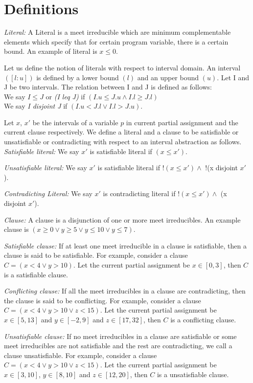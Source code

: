 \section{Definitions}
%
\textit{Literal:} A Literal is a meet irreducible which are minimum complementable
elements which specify that for certain program variable, there is a certain
bound. An example of literal is $x \leq 0$.

Let us define the notion of literals with respect to interval domain. 
An interval $([l:u])$ is defined by a lower bound $(l)$ and an upper bound $(u)$.
Let I and J be two intervals. The relation between I and J is defined as follows:\\
We say $I \leq J$ or {\em (I leq J)} if $(I.u \leq J.u \wedge I.l \geq J.l)$\\
We say {\em I disjoint J} if $(I.u < J.l \vee  I.l > J.u)$.

Let $x$, $x'$ be the intervals of a variable $p$ in current 
partial assignment and the current clause respectively. 
We define a literal and a clause to be satisfiable or unsatisfiable 
or contradicting with respect to an interval abstraction as follows. \\
\textit{Satisfiable literal:} 
We say $x'$ is satisfiable literal if $(x \leq x')$.

\textit{Unsatisfiable literal:}
We say $x'$ is satisfiable literal if $!(x \leq x') \wedge$ $!$(x disjoint $x'$).

\textit{Contradicting Literal:}
We say $x'$ is contradicting literal if $!(x \leq x') \wedge$ (x disjoint $x'$).

\textit{Clause:} A clause is a disjunction of one or more meet irreducibles. An 
example clause is $(x \geq 0 \vee y \geq 5 \vee y \leq 10 \vee y \leq 7)$.

\textit{Satisfiable clause:}
If at least one meet irreducible in a clause is satisfiable, then a clause is said to 
be satisfiable. For example, consider a clause $C=(x<4 \vee y>10)$. Let the 
current partial assignment be $x \in [0,3]$, then $C$ is a satisfiable clause. 

\textit{Conflicting clause:}
If all the meet irreducibles in a clause are contradicting, then the clause is said to
be conflicting. For example, consider a clause $C=(x<4 \vee y>10 \vee z<15)$. Let the 
current partial assignment be $x \in [5,13]$ and $y \in [-2,9]$ and $z \in
[17,32]$, then $C$ is a conflicting clause.

\textit{Unsatisfiable clause:}
If no meet irreducibles in a clause are satisfiable or some meet
irreducibles are not satisfiable and the rest are contradicting, we call a 
clause unsatisfiable. For example, consider a clause $C=(x<4 \vee y>10 \vee z<15)$. 
Let the current partial assignment be $x \in [3,10]$, $y \in [8,10]$ and $z \in [12,20]$, 
then $C$ is a unsatisfiable clause. 


